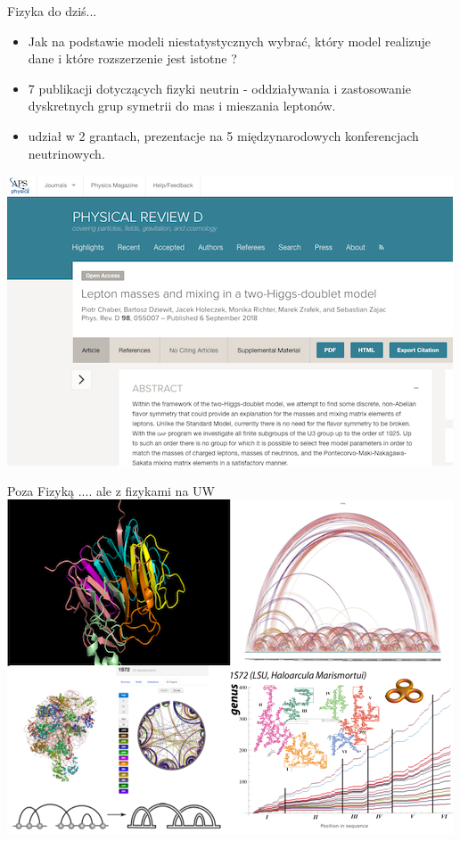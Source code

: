 \documentclass{beamer}
\begin{document}
\begin{frame}{Fizyka do dziś...}
\begin{itemize}
\item Jak na podstawie modeli niestatystycznych wybrać, który model realizuje dane i które rozszerzenie jest istotne ? 
\item 7 publikacji dotyczących fizyki neutrin - oddziaływania i zastosowanie dyskretnych grup symetrii do mas i mieszania leptonów. 
\item udział w 2 grantach, prezentacje na 5 międzynarodowych konferencjach neutrinowych. 
\end{itemize}
\begin{center}
\includegraphics[scale=0.3]{pub3}
\end{center}
\end{frame}



\begin{frame}{Poza Fizyką .... ale z fizykami na UW}
\includegraphics[width=\textwidth]{protein.png}
\end{frame}
\end{document}
